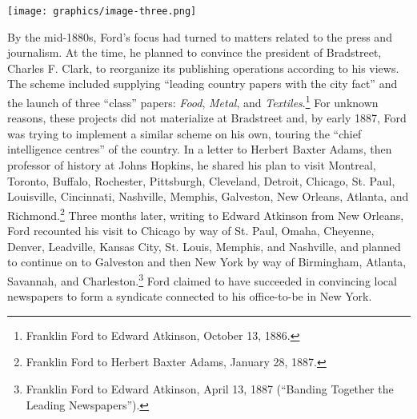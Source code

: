 \documentclass[openany,nobib]{tufte-book}
\begin{document}
\begin{figure*}
   \texttt{[image: graphics/image-three.png]}
   \label{fig:fig3}
\end{figure*}


\newpage By the mid-1880s, Ford's focus had turned to matters related to the
press and journalism. At the time, he planned to convince the president
of Bradstreet, Charles F. Clark, to reorganize its publishing operations
according to his views. The scheme included supplying ``leading country
papers with the city fact'' and the launch of three ``class'' papers:
\emph{Food}, \emph{Metal}, and \emph{Textiles}.\footnote{Franklin Ford
  to Edward Atkinson, October 13, 1886.} For unknown reasons, these
projects did not materialize at Bradstreet and, by early 1887, Ford was
trying to implement a similar scheme on his own, touring the ``chief
intelligence centres'' of the country. In a letter to Herbert Baxter
Adams, then professor of history at Johns Hopkins, he shared his plan to
visit Montreal, Toronto, Buffalo, Rochester, Pittsburgh, Cleveland,
Detroit, Chicago, St. Paul, Louisville, Cincinnati, Nashville, Memphis,
Galveston, New Orleans, Atlanta, and Richmond.\footnote{Franklin Ford to
  Herbert Baxter Adams, January 28, 1887.} Three months later, writing
to Edward Atkinson from New Orleans, Ford recounted his visit to Chicago
by way of St. Paul, Omaha, Cheyenne, Denver, Leadville, Kansas City, St.
Louis, Memphis, and Nashville, and planned to continue on to Galveston
and then New York by way of Birmingham, Atlanta, Savannah, and
Charleston.\footnote{Franklin Ford to Edward Atkinson, April 13, 1887
  (``Banding Together the Leading Newspapers'').} Ford claimed to have
succeeded in convincing local newspapers to form a syndicate connected
to his office-to-be in New York.
\end{document}

